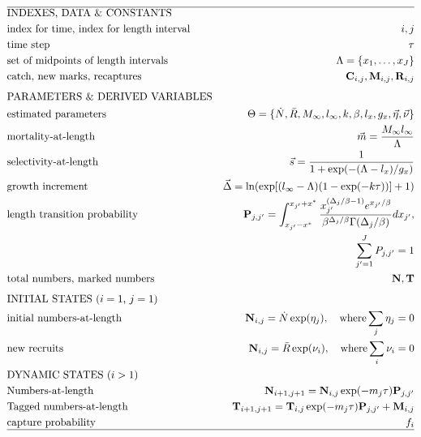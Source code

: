\begin{table}
  \centering
\caption{Data, parameters, and analytical procedures for the length-based mark-recapture model.}\label{table:LSMRmodel} 
\tableEq
	\begin{small}
    \begin{align}
        \hline
		&\mbox{INDEXES, DATA \& CONSTANTS} \nonumber\\
		&\mbox{index for time, index for length interval} 
		&i,j \label{eq:T1.1}\\ 
		&\mbox{time step}  & \tau\\
		&\mbox{set of midpoints of length intervals}
		&\Lambda = \{x_1, \ldots,x_J\}\\
		&\mbox{catch, new marks, recaptures} 
		&\mathbf{C}_{i,j}, \mathbf{M}_{i,j}, \mathbf{R}_{i,j}\\[1ex]
		&\mbox{PARAMETERS \& DERIVED VARIABLES} \nonumber\\
		&\mbox{estimated parameters} 
		&\Theta=\{\dot{N},\bar{R},M_\infty,l_\infty,k,\beta,l_x,g_x,
			\vec{\eta},\vec{\nu} \}\\
		&\mbox{mortality-at-length} 
		& \vec{m} = \frac{M_\infty l_\infty}{\Lambda}
		\label{eq:T1.6}\\
		&\mbox{selectivity-at-length} 
		& \vec{s} = \frac{1}{1+\exp(-(\Lambda-l_x)/g_x)}
		\label{eq:T1.7}\\
		&\mbox{growth increment} 
		& \vec{\Delta} = \ln( \exp[(l_\infty-\Lambda)(1-\exp(-k \tau))] +1)
		\label{eq:T1.8}\\
		&\mbox{length transition probability}
		& \mathbf{P}_{j,j'} =\int_{x_{j'}-x^*}^{x_{j'}+x^*} \frac{x_{j'}^{(\Delta_{j}/\beta-1)}
		e^{x_{j'}/\beta}}{\beta^{\Delta_{j}/\beta} \Gamma(\Delta_{j}/\beta)}dx_{j'}, \nonumber\\
		& &\quad \sum_{j'=1}^J P_{j,j'}= 1 
		\label{eq:T1.9}\\
		&\mbox{total numbers, marked numbers} 
		& \mathbf{N}, \mathbf{T}\\[1ex]
		&\mbox{INITIAL STATES ($i=1$, $j=1$)}  \nonumber\\
		&\mbox{initial numbers-at-length}
		&\mathbf{N}_{i,j} = \dot{N}\exp(\eta_j), \quad \mbox{where} \sum_j \eta_j=0
		\label{eq:T1.11}\\
		&\mbox{new recruits}
		&\mathbf{N}_{i,j} = \bar{R}\exp(\nu_i), \quad \mbox{where} \sum_i \nu_i=0
		\label{eq:T1.12}\\
		&\mbox{DYNAMIC STATES ($i>1$)} \nonumber\\
		&\mbox{Numbers-at-length}
		&\mathbf{N}_{i+1,j+1} = \mathbf{N}_{i,j} \exp(-m_j \tau) \mathbf{P}_{j,j'}\\
		&\mbox{Tagged numbers-at-length}
		&\mathbf{T}_{i+1,j+1} = \mathbf{T}_{i,j} \exp(-m_j \tau) \mathbf{P}_{j,j'} + \mathbf{M}_{i,j}\\
		&\mbox{capture probability} 
		& f_i\\
		\hline \nonumber
    \end{align}
\end{small}
    \normalEq
\end{table}

